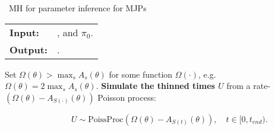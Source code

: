\begin{algorithm}[H]
   \caption{\Naive\  MH for parameter inference for MJPs }
   \label{alg:MH_naive}
  \begin{tabular}{l l}
   \textbf{Input:  } & \text{Observations $X$}, 
                       \text{the MJP path $(s_0, S, T)$, the  MJP parameters $\theta$ }and $\pi_0$.\\ 
   \textbf{Output:  }& \text{A new MJP trajectory $(s'_0, S', T')$, 
                            new MJP parameter $\theta'$}.\\
   \hline
   \end{tabular}
   \begin{algorithmic}[1]
     \State Set $\Omega(\theta) > \max_s{A_s(\theta)}$ for
     some function $\Omega(\cdot)$, e.g.\ $\Omega(\theta) = 
      2\max_s A_s(\theta)$.
      \State \textbf{Simulate the thinned times $U$} from a rate-$(\Omega(\theta)-A_{S(\cdot)}(\theta))$ Poisson process: 

      $\qquad \qquad \qquad \qquad U \sim \text{PoissProc}(\Omega(\theta) - A_{S(t)}(\theta)), \quad t\in[0,t_{end})$.


\end{algorithmic}
\end{algorithm}
